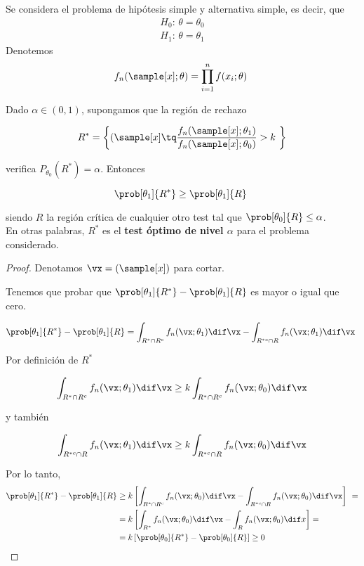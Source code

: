 \documentclass{apuntes}
\begin{document}
\pagebreak
\begin{theorem}\label{thmNeymanPearson}
Se considera el problema de hipótesis simple y alternativa simple, es decir, que
\begin{gather*}
H_0:\,\theta=\theta_0\\
H_1:\,\theta=\theta_1
\end{gather*}
\indent Denotemos
\[ f_n(\sample[x];\theta) = \prod_{i=1}^n f(x_i;\theta) \]

Dado $\alpha\in(0,1)$, supongamos que la región de rechazo

\[ R^\ast = \left\{ (\sample[x]\tq \frac{f_n(\sample[x];\theta_1)}{f_n(\sample[x];\theta_0)} > k \right\} \]

verifica $P_{\theta_0}(R^{\ast}) = \alpha$. Entonces

\[ \prob[\theta_1]{R^\ast} \geq \prob[\theta_1]{R} \]

siendo $R$ la región crítica de cualquier otro test tal que $ \prob[\theta_0]{R} \leq \alpha $.\\
En otras palabras, $ R^\ast $ es el \textbf{test óptimo de nivel $\alpha$} para el problema considerado.
\end{theorem}

\begin{proof} Denotamos $\vx = (\sample[x])$ para cortar.

Tenemos que probar que $\prob[\theta_1]{R^\ast} - \prob[\theta_1]{R}$ es mayor o igual que cero.

\[ \prob[\theta_1]{R^\ast} - \prob[\theta_1]{R} = \int_{R^\ast\cap R^c} f_n(\vx;\theta_1)\dif\vx - \int_{R^{\ast c}\cap R} f_n(\vx;\theta_1)\dif\vx \]

Por definición de $R^\ast$

\[ \int_{R^\ast\cap R^c} f_n(\vx;\theta_1)\dif\vx \geq k \int_{R^\ast\cap R^c} f_n(\vx;\theta_0)\dif\vx \]

y también

\[ \int_{R^{\ast c}\cap R} f_n(\vx;\theta_1)\dif\vx \geq k \int_{R^{\ast c}\cap R} f_n(\vx;\theta_0)\dif\vx \]

Por lo tanto,
\begin{align*}
\prob[\theta_1]{R^\ast} - \prob[\theta_1]{R} &\geq k\left[\int_{R^\ast\cap R^c} f_n(\vx;\theta_0)\dif\vx - \int_{R^{\ast c}\cap R} f_n(\vx;\theta_0)\dif\vx \right] = \\
&= k\left[\int_{R^\ast}f_n(\vx;\theta_0)\dif \vx - \int_R f_n(\vx;\theta_0)\dif x\right] = \\
&= k\left[\prob[\theta_0]{R^\ast} - \prob[\theta_0]{R}\right] \geq 0
\end{align*}

\end{proof}
\end{document}
